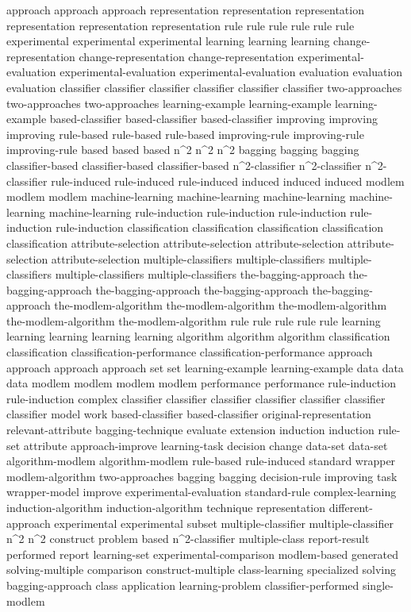 approach	approach	approach	
representation	representation	representation	representation	representation	representation	
rule	rule	rule	rule	rule	rule	
experimental	experimental	experimental	
learning	learning	learning	
change-representation	change-representation	change-representation	
experimental-evaluation	experimental-evaluation	experimental-evaluation	
evaluation	evaluation	evaluation	
classifier	classifier	classifier	classifier	classifier	classifier	
two-approaches	two-approaches	two-approaches	
learning-example	learning-example	learning-example	
based-classifier	based-classifier	based-classifier	
improving	improving	improving	
rule-based	rule-based	rule-based	
improving-rule	improving-rule	improving-rule	
based	based	based	
n^2	n^2	n^2	
bagging	bagging	bagging	
classifier-based	classifier-based	classifier-based	
n^2-classifier	n^2-classifier	n^2-classifier	
rule-induced	rule-induced	rule-induced	
induced	induced	induced	
modlem	modlem	modlem	
machine-learning	machine-learning	machine-learning	machine-learning	machine-learning	
rule-induction	rule-induction	rule-induction	rule-induction	rule-induction	
classification	classification	classification	classification	classification	
attribute-selection	attribute-selection	attribute-selection	attribute-selection	attribute-selection	
multiple-classifiers	multiple-classifiers	multiple-classifiers	multiple-classifiers	multiple-classifiers	
the-bagging-approach	the-bagging-approach	the-bagging-approach	the-bagging-approach	the-bagging-approach	
the-modlem-algorithm	the-modlem-algorithm	the-modlem-algorithm	the-modlem-algorithm	the-modlem-algorithm	
rule	rule	rule	rule	rule	
learning	learning	learning	learning	learning	
algorithm	algorithm	algorithm	
classification	classification	
classification-performance	classification-performance	
approach	approach	approach	approach	
set	set	
learning-example	learning-example	
data	data	data	
modlem	modlem	modlem	modlem	
performance	performance	
rule-induction	rule-induction	
complex	
classifier	classifier	classifier	classifier	classifier	classifier	classifier	
model	
work	
based-classifier	based-classifier	
original-representation	
relevant-attribute	
bagging-technique	
evaluate	
extension	
induction	induction	
rule-set	
attribute	
approach-improve	
learning-task	
decision	
change	
data-set	data-set	
algorithm-modlem	algorithm-modlem	
rule-based	
rule-induced	
standard	
wrapper	
modlem-algorithm	
two-approaches	
bagging	bagging	
decision-rule	
improving	
task	
wrapper-model	
improve	
experimental-evaluation	
standard-rule	
complex-learning	
induction-algorithm	induction-algorithm	
technique	
representation	
different-approach	
experimental	experimental	
subset	
multiple-classifier	multiple-classifier	
n^2	n^2	
construct	
problem	
based	
n^2-classifier	
multiple-class	
report-result	
performed	
report	
learning-set	
experimental-comparison	
modlem-based	
generated	
solving-multiple	
comparison	
construct-multiple	
class-learning	
specialized	
solving	
bagging-approach	
class	
application	
learning-problem	
classifier-performed	
single-modlem	
